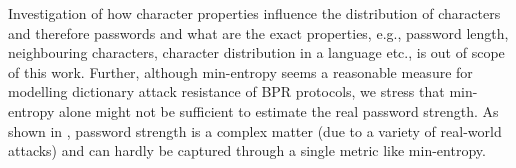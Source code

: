 
\begin{remark}
Investigation of how character properties influence the distribution \DD of characters and therefore passwords and what are the exact properties, e.g., password length, neighbouring characters, character distribution in a language etc., is out of scope of this work.
Further, although min-entropy seems a reasonable measure for modelling dictionary attack resistance of BPR protocols,
we stress that min-entropy alone might not be sufficient to estimate the real password strength. 
As shown in \cite{MazurekKVBCCKSU13}, password strength is a complex matter (due to a variety of real-world attacks) and can hardly be captured through a single metric like min-entropy.
\end{remark}



